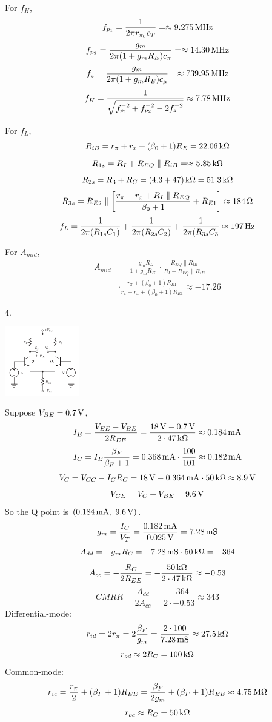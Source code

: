 \documentclass[landscape,a4paper]{article}
\newcommand{\unit}[1]{{\rm\,#1}}
\begin{document}
\begin{multicols}{3}
For $f_H$,
$$f_{p_1}=\frac{1}{2\pi r_{\pi_0}c_T}=\approx9.275\unit{MHz}$$
$$f_{p_2}=\frac{g_m}{2\pi(1+g_mR_E)c_\pi}=\approx14.30\unit{MHz}$$
$$f_{z}=\frac{g_m}{2\pi(1+g_mR_E)c_\mu}=\approx739.95\unit{MHz}$$
$$f_H=\frac{1}{\sqrt{f_{p_1}^{-2}+f_{p_2}^{-2}-2f_{z}^{-2}}}\approx7.78\unit{MHz}$$

For $f_L$,
$$R_{iB}=r_\pi+r_x+(\beta_0+1)R_E=22.06\unit{k\Omega}$$
$$R_{1s}=R_I+R_{EQ}\parallel R_{iB}=\approx5.85\unit{k\Omega}$$
$$R_{2s}=R_3+R_C=(4.3+47)\unit{k\Omega}=51.3\unit{k\Omega}$$
$$R_{3s}=R_{E2}\parallel\left[\frac{r_\pi+r_x+R_I\parallel R_{EQ}}{\beta_0+1}+R_{E1}\right]\approx184\unit{\Omega}$$
$$f_L=\frac{1}{2\pi(R_{1s}C_1)}+\frac{1}{2\pi(R_{2s}C_2)}+\frac{1}{2\pi(R_{3s}C_3}\approx197\unit{Hz}$$

For $A_{mid}$,
$$\begin{aligned}A_{mid}&=\frac{-g_mR_L}{1+g_mR_{E1}}\cdot\frac{R_{EQ}\parallel R_{iB}}{R_I+R_{EQ}\parallel R_{iB}}\\&\cdot\frac{r_\pi+(\beta_0+1)R_{E1}}{r_\pi+r_x+(\beta_0+1)R_{E1}}\approx-17.26\end{aligned}$$

4.
\begin{center}
\includegraphics[height=3cm]{6.1.png}
\end{center}
Suppose $V_{BE}=0.7\unit{V}$,
$$I_E=\frac{V_{EE}-V_{BE}}{2R_{EE}}=\frac{18\unit{V}-0.7\unit{V}}{2\cdot47\unit{k\Omega}}\approx0.184\unit{mA}$$
$$I_C=I_E\frac{\beta_F}{\beta_F+1}=0.368\unit{mA}\cdot\frac{100}{101}\approx0.182\unit{mA}$$
$$V_{C}=V_{CC}-I_CR_C=18\unit{V}-0.364\unit{mA}\cdot50\unit{k\Omega}\approx8.9\unit{V}$$
$$V_{CE}=V_{C}+V_{BE}=9.6\unit{V}$$
So the Q point is $(0.184\unit{mA},\ 9.6\unit{V})$.
$$g_m=\frac{I_C}{V_T}=\frac{0.182\unit{mA}}{0.025\unit{V}}=7.28\unit{mS}$$
$$A_{dd}=-g_mR_C=-7.28\unit{mS}\cdot50\unit{k\Omega}=-364$$
$$A_{cc}=-\frac{R_C}{2R_{EE}}=-\frac{50\unit{k\Omega}}{2\cdot47\unit{k\Omega}}\approx-0.53$$
$$CMRR = \frac{A_{dd}}{2A_{cc}} = \frac{-364}{2\cdot -0.53} \approx 343$$
Differential-mode:
$$r_{id}=2r_{\pi}=2\frac{\beta_F}{g_m}=\frac{2\cdot100}{7.28\unit{mS}}\approx27.5\unit{k\Omega}$$
$$r_{od}\approx 2R_C=100\unit{k\Omega}$$
Common-mode:
$$r_{ic}=\frac{r_{\pi}}{2}+(\beta_F+1)R_{EE}=\frac{\beta_F}{2g_m}+(\beta_F+1)R_{EE}\approx4.75\unit{M\Omega}$$
$$r_{oc}\approx R_C=50\unit{k\Omega}$$


\end{multicols}
\end{document}
